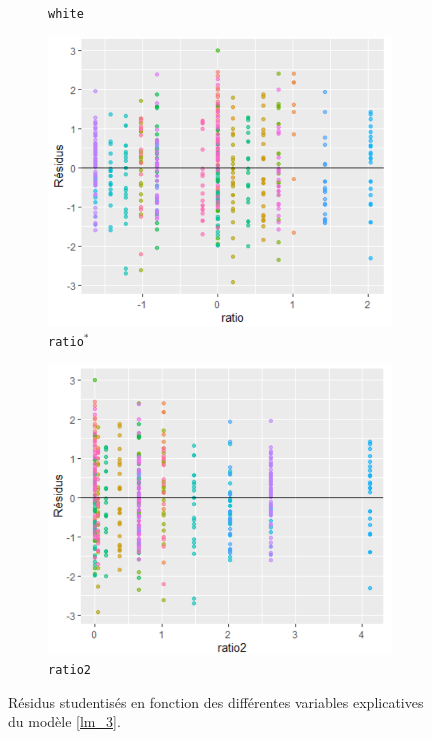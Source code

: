 \documentclass{article}
\begin{document}
\begin{figure}[H]
\begin{subfigure}{0.48\textwidth}
		\caption{\texttt{white}}
		\label{Residus_VS_white}
	\end{subfigure}
	\begin{subfigure}{0.48\textwidth}
		\includegraphics[width=1\textwidth]{graphiques/Residus_VS_ratio}
		\caption{\texttt{ratio}$^*$}
		\label{Residus_VS_ratio}
	\end{subfigure}
	\begin{subfigure}{0.48\textwidth}
		\includegraphics[width=1\textwidth]{graphiques/Residus_VS_ratio2}
		\caption{\texttt{ratio2}}
		\label{Residus_VS_ratio2}
	\end{subfigure}
	\caption{Résidus studentisés en fonction des différentes variables explicatives du modèle \ref{lm_3}.}
	\label{Residus_VS_variables_lm3}
\end{figure}
\end{document}
